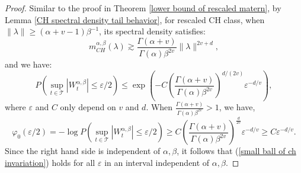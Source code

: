 \documentclass[ejs,noshowframe]{imsart}
\theoremstyle{plain}
\theoremstyle{definition}
\theoremstyle{remark}
\begin{document}
\begin{appendix}
\begin{proof}
Similar to the proof in Theorem \ref{lower bound of rescaled matern}, by Lemma \ref{CH spectral density tail behavior},  for rescaled CH class,  when $\|\lambda\| \ge (\alpha+v-1)\beta^{-1}$, its spectral density satisfies:
$$
m^{\alpha,\beta}_{CH}(\lambda) \gtrsim \frac{\Gamma(\alpha +v)}{\Gamma(\alpha )\beta^{2v}} \|\lambda\|^{2v+d},
$$
and  we have:
$$
P\left(\sup_{t \in \mathcal{T}} |W_t^{\alpha,\beta}| \le \varepsilon/2\right) \le \exp\left(-C \left(\frac{\Gamma(\alpha+v)}{\Gamma(\alpha) \beta^{2v}}\right)^{d/(2v)}\varepsilon^{-d/v}\right),
$$
where $\varepsilon$ and $C$ only depend on $v$ and $d$.  When $\frac{\Gamma(\alpha+v)}{\Gamma(\alpha) \beta^{2v}} >1$, we have,
$$
\varphi_0(\varepsilon/2) = - \log P\left(\sup_{t \in \mathcal{T}} |W_t^{\alpha,\beta}| \le \varepsilon/2\right)  \ge C \left(\frac{\Gamma(\alpha+v)}{\Gamma(\alpha) \beta^{2v}}\right)^{\frac{d}{2v}}\varepsilon^{-d/v} \ge C \varepsilon^{-d/v}.
$$
Since the right hand side is independent of $\alpha, \beta$, it follows that (\ref{small ball of ch invariation}) holds for all $\varepsilon$ in an interval independent
of $\alpha, \beta$. 
\end{proof}


\end{appendix}
\end{document}
